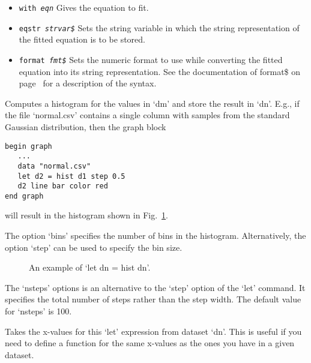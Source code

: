 \begin{commanddescription}
\begin{itemize}
\item \texttt{with {\it eqn}} Gives the equation to fit.

\item \texttt{eqstr {\it strvar\$}} Sets the string variable in which the string representation of the fitted equation is to be stored.

\item \texttt{format {\it fmt\$}} Sets the numeric format to use while converting the fitted equation into its string representation. See the documentation of {\sf format\$} on page~\pageref{formatnum:pg} for a description of the syntax.
\end{itemize}

\item[{\sf let ds = hist dm [from {\it x1}] [to {\it x2}] [bins {\it n}] [step {\it n}]}]

Computes a histogram for the values in `dm' and store the result in `dn'. E.g., if the file `normal.csv' contains a single column with samples from the standard Gaussian distribution, then the graph block

\begin{Verbatim}
begin graph
   ...
   data "normal.csv"
   let d2 = hist d1 step 0.5
   d2 line bar color red 
end graph
\end{Verbatim}

\noindent{}will result in the histogram shown in Fig.~\ref{hist:fig}.

The option `{\sf bins}' specifies the number of bins in the histogram. Alternatively, the option `{\sf step}' can be used to specify the bin size.

\begin{figure}[tb]
\centering
\mbox{}
\caption{\label{hist:fig}An example of `let dn = hist dn'.}
\end{figure}

\item[{\sf let ds = \ldots [nsteps {\it n}]}]

The `nsteps' options is an alternative to the `step' option of the `let' command. It specifies the total number of steps rather than the step width. The default value for `nsteps' is 100.

\item[{\sf let ds = \ldots [range {\it dn}]}]

Takes the x-values for this `let' expression from dataset `dn'. This is useful if you need to define a function for the same x-values as the ones you have in a given dataset.


\end{commanddescription}
